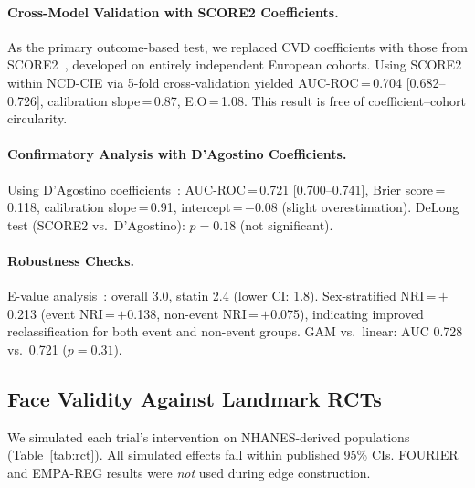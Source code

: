 \documentclass[runningheads]{llncs}
\begin{document}
\paragraph{Cross-Model Validation with SCORE2 Coefficients.}
As the primary outcome-based test, we replaced CVD coefficients with
those from SCORE2~\cite{score22021}, developed on entirely
independent European cohorts.
Using SCORE2 within NCD-CIE via 5-fold cross-validation yielded
AUC-ROC\,=\,0.704 [0.682--0.726], calibration slope\,=\,0.87,
E:O\,=\,1.08.
This result is free of coefficient--cohort circularity.

\paragraph{Confirmatory Analysis with D'Agostino Coefficients.}
Using D'Agostino coefficients~\cite{dagostino2008}:
AUC-ROC\,=\,0.721 [0.700--0.741],
Brier score\,=\,0.118,
calibration slope\,=\,0.91,
intercept\,=\,$-$0.08 (slight overestimation).
DeLong test (SCORE2 vs.\ D'Agostino): $p = 0.18$ (not significant).

\paragraph{Robustness Checks.}
E-value analysis~\cite{vanderweele2017evalue}: overall 3.0,
statin 2.4 (lower CI: 1.8).
Sex-stratified NRI\,=\,$+$0.213 (event NRI\,=\,$+$0.138,
non-event NRI\,=\,$+$0.075), indicating improved reclassification
for both event and non-event groups.
GAM vs.\ linear: AUC 0.728 vs.\ 0.721 ($p = 0.31$).

\subsection{Face Validity Against Landmark RCTs}\label{sec:faceval}

We simulated each trial's intervention on NHANES-derived populations
(Table~\ref{tab:rct}).
All simulated effects fall within published 95\% CIs.
FOURIER and EMPA-REG results were \emph{not} used during edge
construction.
\end{document}
